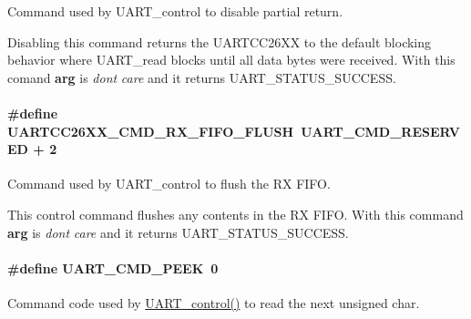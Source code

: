 Command used by U\+A\+R\+T\+\_\+control to disable partial return. 

Disabling this command returns the U\+A\+R\+T\+C\+C26\+X\+X to the default blocking behavior where U\+A\+R\+T\+\_\+read blocks until all data bytes were received. With this comand {\bfseries arg} is {\itshape don\textquotesingle{}t} {\itshape care} and it returns U\+A\+R\+T\+\_\+\+S\+T\+A\+T\+U\+S\+\_\+\+S\+U\+C\+C\+E\+S\+S. 
\paragraph[{U\+A\+R\+T\+C\+C26\+X\+X\+\_\+\+C\+M\+D\+\_\+\+R\+X\+\_\+\+F\+I\+F\+O\+\_\+\+F\+L\+U\+S\+H}]{\setlength{\rightskip}{0pt plus 5cm}\#define U\+A\+R\+T\+C\+C26\+X\+X\+\_\+\+C\+M\+D\+\_\+\+R\+X\+\_\+\+F\+I\+F\+O\+\_\+\+F\+L\+U\+S\+H~{\bf U\+A\+R\+T\+\_\+\+C\+M\+D\+\_\+\+R\+E\+S\+E\+R\+V\+E\+D} + 2}\label{group___u_a_r_t___c_m_d_ga56280a288223c44c73a5169e957dc078}


Command used by U\+A\+R\+T\+\_\+control to flush the R\+X F\+I\+F\+O. 

This control command flushes any contents in the R\+X F\+I\+F\+O. With this command {\bfseries arg} is {\itshape don\textquotesingle{}t} {\itshape care} and it returns U\+A\+R\+T\+\_\+\+S\+T\+A\+T\+U\+S\+\_\+\+S\+U\+C\+C\+E\+S\+S. 
\paragraph[{U\+A\+R\+T\+\_\+\+C\+M\+D\+\_\+\+P\+E\+E\+K}]{\setlength{\rightskip}{0pt plus 5cm}\#define U\+A\+R\+T\+\_\+\+C\+M\+D\+\_\+\+P\+E\+E\+K~0}\label{group___u_a_r_t___c_m_d_ga942596a37cb2109ae021f88f3d907bdc}


Command code used by \hyperlink{_u_a_r_t_8h_a9de3c26cfe4ce6b7f350a6ea6e16801d}{U\+A\+R\+T\+\_\+control()} to read the next unsigned char. 

